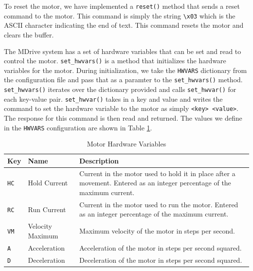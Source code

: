 To reset the motor, we have implemented a \texttt{reset()} method that sends a reset command to the motor.
This command is simply the string \texttt{\textbackslash x03} which is the ASCII character indicating the end of text.
This command resets the motor and clears the buffer.

The MDrive system has a set of hardware variables that can be set and read to control the motor.
\texttt{set\_hwvars()} is a method that initializes the hardware variables for the motor.
During initialization, we take the \texttt{HWVARS} dictionary from the configuration file and pass that as a paramter to the \texttt{set\_hwvars()} method.
\texttt{set\_hwvars()} iterates over the dictionary provided and calls \texttt{set\_hwvar()} for each key-value pair.
\texttt{set\_hwvar()} takes in a key and value and writes the command to set the hardware variable to the motor as simply \texttt{<key> <value>}.
The response for this command is then read and returned.
The values we define in the \texttt{HWVARS} configuration are shown in Table \ref{readout/table:motor_hwvars}.

\begin{table}
    \centering
    \begin{tabularx}{\textwidth}{l|l|X}
        \textbf{Key} & \textbf{Name} & \textbf{Description} \\ \hline    
        \texttt{HC} & Hold Current & Current in the motor used to hold it in place after a movement. Entered as an integer percentage of the maximum current.\\
        \texttt{RC} & Run Current & Current in the motor used to run the motor. Entered as an integer percentage of the maximum current.\\
        \texttt{VM} & Velocity Maximum & Maximum velocity of the motor in steps per second.\\
        \texttt{A} & Acceleration & Acceleration of the motor in steps per second squared.\\
        \texttt{D} & Deceleration & Deceleration of the motor in steps per second squared.
    \end{tabularx}
    \label{readout/table:motor_hwvars}
    \caption{Motor Hardware Variables}
\end{table}

